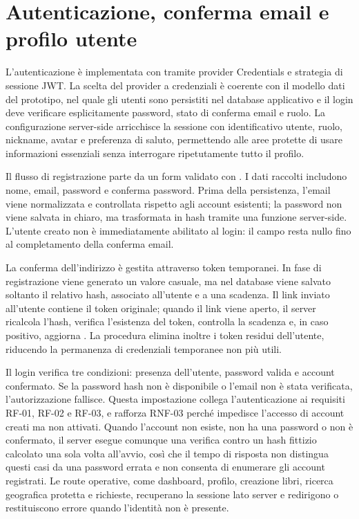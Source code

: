 \section{Autenticazione, conferma email e profilo utente}
\label{sec:implementazione-auth-profilo}

L'autenticazione è implementata con \authjs{} tramite provider Credentials e strategia di sessione JWT. La scelta del provider a credenziali è coerente con il modello dati del prototipo, nel quale gli utenti sono persistiti nel database applicativo e il login deve verificare esplicitamente password, stato di conferma email e ruolo. La configurazione server-side arricchisce la sessione con identificativo utente, ruolo, nickname, avatar e preferenza di saluto, permettendo alle aree protette di usare informazioni essenziali senza interrogare ripetutamente tutto il profilo.

Il flusso di registrazione parte da un form validato con . I dati raccolti includono nome, email, password e conferma password. Prima della persistenza, l'email viene normalizzata e controllata rispetto agli account esistenti; la password non viene salvata in chiaro, ma trasformata in hash tramite una funzione server-side. L'utente creato non è immediatamente abilitato al login: il campo  resta nullo fino al completamento della conferma email.

La conferma dell'indirizzo è gestita attraverso token temporanei. In fase di registrazione viene generato un valore casuale, ma nel database viene salvato soltanto il relativo hash, associato all'utente e a una scadenza. Il link inviato all'utente contiene il token originale; quando il link viene aperto, il server ricalcola l'hash, verifica l'esistenza del token, controlla la scadenza e, in caso positivo, aggiorna . La procedura elimina inoltre i token residui dell'utente, riducendo la permanenza di credenziali temporanee non più utili.

Il login verifica tre condizioni: presenza dell'utente, password valida e account confermato. Se la password hash non è disponibile o l'email non è stata verificata, l'autorizzazione fallisce. Questa impostazione collega l'autenticazione ai requisiti RF-01, RF-02 e RF-03, e rafforza RNF-03 perché impedisce l'accesso di account creati ma non attivati. Quando l'account non esiste, non ha una password o non è confermato, il server esegue comunque una verifica  contro un hash fittizio calcolato una sola volta all'avvio, così che il tempo di risposta non distingua questi casi da una password errata e non consenta di enumerare gli account registrati. Le route operative, come dashboard, profilo, creazione libri, ricerca geografica protetta e richieste, recuperano la sessione lato server e redirigono o restituiscono errore quando l'identità non è presente.

